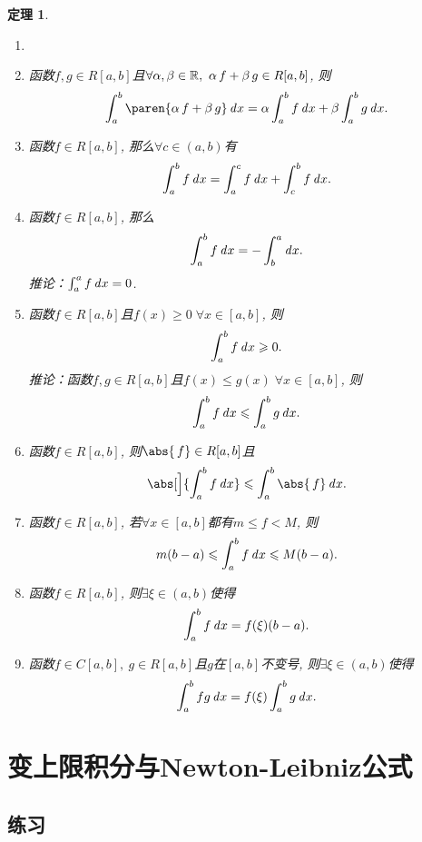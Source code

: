 \documentclass[a4paper,punct=CCT]{ctexbook}
\newtheorem*{theorem*}{定理}
\theoremstyle{definition}
\theoremstyle{remark}
\newif\ifshowex
\let\leq\leqslant
\let\le\leq
\let\geq\geqslant
\let\ge\geq}
\begin{document}
\begin{theorem*}
  \begin{enumerate}
  \item[]
  \item 函数\(f, g \in R[a,b]\)且\(\forall \alpha, \beta \in \mathbb{R},\ \alpha\,f + \beta\,g \in R[a,b]\), 则
    \[
      \int_a^b \paren{\alpha\,f + \beta\,g} \dx
      = \alpha \int_a^b f \dx + \beta \int_a^b g \dx.
    \]

  \item 函数\(f \in R[a,b]\), 那么\(\forall c \in (a,b)\)有
    \[
      \int_a^b f \mathop{}\!\mathit{d} x = \int_a^c f \mathop{}\!\mathit{d} x + \int_c^b f \mathop{}\!\mathit{d} x.
    \]

  \item 函数\(f \in R[a,b]\), 那么
    \[
      \int_a^b f \mathop{}\!\mathit{d} x = - \int_b^a \mathop{}\!\mathit{d} x.
    \]
    推论：\(\int_a^a f \mathop{}\!\mathit{d} x = 0\).

  \item 函数\(f \in R[a,b]\)且\(f(x) \ge 0\; \forall x \in [a,b]\), 则
    \[
      \int_a^b f \dx \ge 0.
    \]
    推论：函数\(f, g \in R[a,b]\)且\(f(x) \le g(x)\; \forall x \in [a,b]\), 则
    \[
      \int_a^b f \dx \le \int_a^b g \dx.
    \]

  \item 函数\(f \in R[a,b]\), 则\(\abs{\,f} \in R[a,b]\)且
    \[
      \abs[\Big]{\int_a^b f \dx} \le \int_a^b \abs{\,f} \dx.
    \]

  \item 函数\(f \in R[a,b]\), 若\(\forall x \in [a,b]\)都有\(m \le f < M\), 则
    \[
      m(b-a) \le \int_a^b f \dx \le M(b-a).
    \]

  \item 函数\(f \in R[a,b]\), 则\(\exists \xi \in (a,b)\)使得
    \[
      \int_a^b f \mathop{}\!\mathit{d} x = f(\xi)(b-a).
    \]

  \item 函数\(f \in C[a,b],\ g \in R[a,b]\)且\(g\)在\([a,b]\)不变号, 则\(\exists \xi \in (a,b)\)使得
    \[
      \int_a^b fg \mathop{}\!\mathit{d} x = f(\xi) \int_a^b g \mathop{}\!\mathit{d} x.
    \]
  \end{enumerate}
\end{theorem*}

\section{变上限积分与Newton-Leibniz公式}

\ifshowex
{}
\subsection*{练习}
\end{document}
